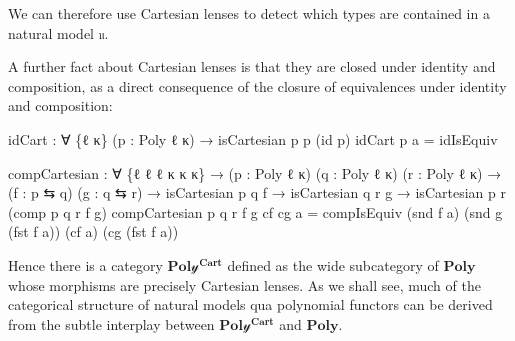\documentclass[
  11pt,
  oneside,
  article]{memoir}
\newenvironment{Shaded}{}{}
\newcommand{\NormalTok}[1]{#1}
\newcommand{\OtherTok}[1]{\textcolor[rgb]{0.00,0.44,0.13}{#1}}
\theoremstyle{definition}
\theoremstyle{plain}
\newcommand{\yon}{\mathcal{y}}
\newcommand{\0}{\textsf{0}}
\newcommand{\1}{\tn{\textsf{1}}}
\begin{document}
We can therefore use Cartesian lenses to detect which types are
contained in a natural model \texttt{𝔲}.

A further fact about Cartesian lenses is that they are closed under
identity and composition, as a direct consequence of the closure of
equivalences under identity and composition:

\begin{Shaded}
\begin{Highlighting}[]
\NormalTok{idCart }\OtherTok{:} \OtherTok{∀} \OtherTok{\{}\NormalTok{ℓ κ}\OtherTok{\}} \OtherTok{(}\NormalTok{p }\OtherTok{:}\NormalTok{ Poly ℓ κ}\OtherTok{)}
         \OtherTok{→}\NormalTok{ isCartesian p p }\OtherTok{(}\NormalTok{id p}\OtherTok{)}
\NormalTok{idCart p a }\OtherTok{=}\NormalTok{ idIsEquiv}

\NormalTok{compCartesian }\OtherTok{:} \OtherTok{∀} \OtherTok{\{}\NormalTok{ℓ ℓ\textquotesingle{} ℓ\textquotesingle{}\textquotesingle{} κ κ\textquotesingle{} κ\textquotesingle{}\textquotesingle{}}\OtherTok{\}}
                \OtherTok{→} \OtherTok{(}\NormalTok{p }\OtherTok{:}\NormalTok{ Poly ℓ κ}\OtherTok{)} \OtherTok{(}\NormalTok{q }\OtherTok{:}\NormalTok{ Poly ℓ\textquotesingle{} κ\textquotesingle{}}\OtherTok{)} \OtherTok{(}\NormalTok{r }\OtherTok{:}\NormalTok{ Poly ℓ\textquotesingle{}\textquotesingle{} κ\textquotesingle{}\textquotesingle{}}\OtherTok{)}
                \OtherTok{→} \OtherTok{(}\NormalTok{f }\OtherTok{:}\NormalTok{ p ⇆ q}\OtherTok{)} \OtherTok{(}\NormalTok{g }\OtherTok{:}\NormalTok{ q ⇆ r}\OtherTok{)}
                \OtherTok{→}\NormalTok{ isCartesian p q f }\OtherTok{→}\NormalTok{ isCartesian q r g }
                \OtherTok{→}\NormalTok{ isCartesian p r }\OtherTok{(}\NormalTok{comp p q r f g}\OtherTok{)}
\NormalTok{compCartesian p q r f g cf cg a }\OtherTok{=} 
\NormalTok{    compIsEquiv }\OtherTok{(}\NormalTok{snd f a}\OtherTok{)} \OtherTok{(}\NormalTok{snd g }\OtherTok{(}\NormalTok{fst f a}\OtherTok{))} \OtherTok{(}\NormalTok{cf a}\OtherTok{)} \OtherTok{(}\NormalTok{cg }\OtherTok{(}\NormalTok{fst f a}\OtherTok{))}
\end{Highlighting}
\end{Shaded}

Hence there is a category \(\mathbf{Pol\yon^{Cart}}\) defined as the wide
subcategory of \(\mathbf{Poly}\) whose morphisms are precisely Cartesian
lenses. As we shall see, much of the categorical structure of natural
models qua polynomial functors can be derived from the subtle interplay
between \(\mathbf{Pol\yon^{Cart}}\) and \(\mathbf{Poly}\).
\end{document}
